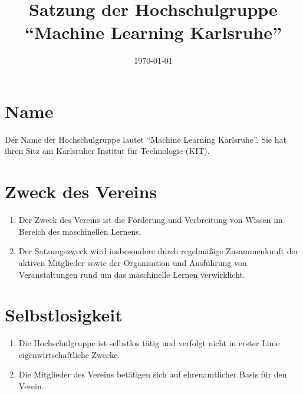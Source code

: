 \documentclass[a4paper]{scrartcl}
\newcommand\GruppenName{Machine Learning Karlsruhe}
\begin{document}
 \author{}
\title{Satzung der Hochschulgruppe \\ \enquote{\GruppenName{}}}
\date{\today}
\maketitle

\section{Name}
Der Name der Hochschulgruppe lautet \enquote{\GruppenName{}}. Sie hat ihren
Sitz am Karlsruher Institut für Technologie (KIT).

\section{Zweck des Vereins}
\begin{enumerate}
    \item Der Zweck des Vereins ist die Förderung und Verbreitung von Wissen
          im Bereich des maschinellen Lernens.
    \item Der Satzungszweck wird insbesondere durch regelmäßige
          Zusammenkunft der aktiven Mitglieder sowie der Organisation und
          Ausführung von Veranstaltungen rund um das maschinelle Lernen
          verwirklicht.
\end{enumerate}

\section{Selbstlosigkeit}
\begin{enumerate}
    \item Die Hochschulgruppe ist selbstlos tätig und verfolgt nicht in erster
          Linie eigenwirtschaftliche Zwecke.
    \item Die Mitglieder des Vereins betätigen sich auf ehrenamtlicher Basis
          für den Verein.
\end{enumerate}
\end{document}
